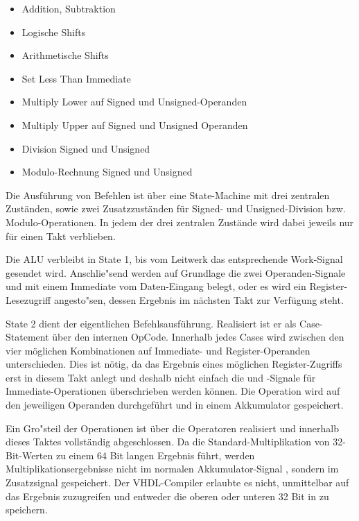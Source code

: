 \begin{itemize}
\item Addition, Subtraktion
\item Logische Shifts
\item Arithmetische Shifts
\item Set Less Than Immediate
\item Multiply Lower auf Signed und Unsigned-Operanden
\item Multiply Upper auf Signed und Unsigned Operanden
\item Division Signed und Unsigned
\item Modulo-Rechnung Signed und Unsigned
\end{itemize}


Die Ausf\"uhrung von Befehlen ist \"uber eine State-Machine mit drei zentralen Zuständen, sowie zwei Zusatzzuständen f\"ur Signed- und Unsigned-Division bzw. Modulo-Operationen. In jedem der drei zentralen Zustände wird dabei jeweils nur f\"ur einen Takt verblieben.

Die ALU verbleibt in State 1, bis vom Leitwerk das entsprechende Work-Signal gesendet wird.
Anschlie"send werden auf Grundlage die zwei Operanden-Signale  und  mit einem Immediate vom Daten-Eingang belegt, oder es wird ein Register-Lesezugriff angesto"sen, dessen Ergebnis im nächsten Takt zur Verf\"ugung steht.

State 2 dient der eigentlichen Befehlsausf\"uhrung. Realisiert ist er als Case-Statement \"uber den internen OpCode. Innerhalb jedes Cases wird zwischen den vier m\"oglichen Kombinationen auf Immediate- und Register-Operanden unterschieden.
Dies ist n\"otig, da das Ergebnis eines m\"oglichen Register-Zugriffs erst in diesem Takt anlegt und deshalb nicht einfach die  und -Signale f\"ur Immediate-Operationen \"uberschrieben werden k\"onnen.
Die Operation wird auf den jeweiligen Operanden durchgef\"uhrt und in einem Akkumulator gespeichert.\vspace{10pt}

Ein Gro"steil der Operationen ist \"uber die  Operatoren realisiert und innerhalb dieses Taktes vollständig abgeschlossen.
Da die Standard-Multiplikation von 32-Bit-Werten zu einem 64 Bit langen Ergebnis f\"uhrt, werden Multiplikationsergebnisse nicht im normalen Akkumulator-Signal , sondern im Zusatzsignal  gespeichert. Der VHDL-Compiler erlaubte es nicht, unmittelbar auf das Ergebnis zuzugreifen und entweder die oberen oder unteren 32 Bit in  zu speichern.\vspace{10pt}

